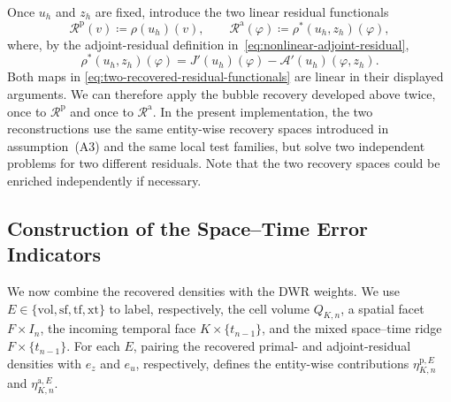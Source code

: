 Once $u_h$ and $z_h$ are fixed, introduce the two linear residual functionals
\begin{equation}
  \mathscr R^{\mathrm p}(v)
  \coloneqq\rho(u_h)(v),
  \qquad
  \mathscr R^{\mathrm a}(\varphi)
  \coloneqq\rho^\ast(u_h,z_h)(\varphi),
  \label{eq:two-recovered-residual-functionals}
\end{equation}
where, by the adjoint-residual definition in~\eqref{eq:nonlinear-adjoint-residual},
\begin{equation}
  \rho^\ast(u_h,z_h)(\varphi)
  =J'(u_h)(\varphi)
   -\mathcal A'(u_h)(\varphi,z_h).
  \label{eq:general-adjoint-residual-functional}
\end{equation}
Both maps in \eqref{eq:two-recovered-residual-functionals} are linear in their displayed arguments. We can therefore apply the bubble recovery developed above twice, once to \(\mathscr R^{\mathrm p}\) and once to \(\mathscr R^{\mathrm a}\). In the present implementation, the two reconstructions use the same entity-wise recovery spaces introduced in assumption~(A3) and the same local test families, but solve two independent problems for two different residuals. Note that the two recovery spaces could be enriched independently if necessary.



\subsection{Construction of the Space--Time Error Indicators}
\label{sec:space-time-local-indicator-construction}

We now combine the recovered densities with the DWR weights. We use \(E\in\{\mathrm{vol},\mathrm{sf},\mathrm{tf},\mathrm{xt}\}\) to label, respectively, the cell volume \(Q_{K,n}\), a spatial facet \(F\times I_n\), the incoming temporal face \(K\times\{t_{n-1}\}\), and the mixed space--time ridge \(F\times\{t_{n-1}\}\). For each \(E\), pairing the recovered primal- and adjoint-residual densities with \(e_z\) and \(e_u\), respectively, defines the entity-wise contributions \(\eta_{K,n}^{\mathrm p,E}\) and \(\eta_{K,n}^{\mathrm a,E}\).

